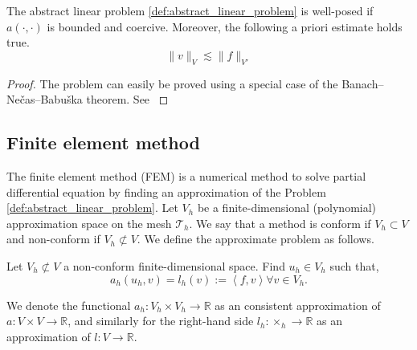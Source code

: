 \begin{lemma}
    \label{def:lax-milgram}
    The abstract linear problem \ref{def:abstract_linear_problem} is well-posed if $a(\cdot , \cdot  ) $ is bounded and coercive. Moreover, the following a priori estimate holds true.\[
    \| v \|_{ V }^{  } \lesssim  \| f \|_{ V'  }^{  }
    \]
\end{lemma}
\begin{proof}
    The problem can easily be proved using a special case of the Banach–Nečas–Babuška theorem. See \cite[Lemma 1.4]{pietro2012}
\end{proof}



\subsection{Finite element method}%
\label{sub:finite_element_method}


The finite element method (FEM) is a numerical method to solve partial differential equation by finding an approximation of the Problem \ref{def:abstract_linear_problem}.  Let $V_{h}$ be a finite-dimensional (polynomial) approximation space on the mesh
$\mathcal{T} _{h}$. We say that a method is conform if $V_{h}\subset V $ and non-conform if $V _{h} \not\subset V$. We define the approximate problem as follows.
\begin{problem}
    \label{def:approx_problem}
    Let $V_{h} \not\subset V$ a non-conform finite-dimensional space. Find  $u_{h} \in V_{h}$ such that, \[
    a_{h}(u_{h},v ) = l_{h}( v) :=  \left<f,v \right>   \forall v \in V_{h}.
    \]
\end{problem}

We denote the functional $a_{h}: V_{h} \times V_{h} \to \mathbb{R} $ as an consistent approximation of $a: V \times V \to \mathbb{R} $, and similarly for the right-hand side $l_{h} : \times _{h} \to \mathbb{R} $ as an approximation of $l: V \to \mathbb{R} $.

